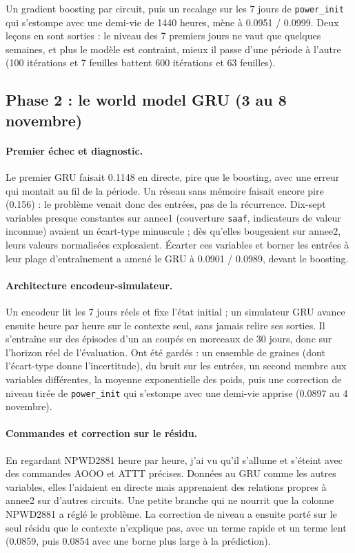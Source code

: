 \documentclass[11pt,a4paper]{article}
\newcommand{\code}[1]{\texttt{#1}}
\begin{document}
Un gradient boosting par circuit, puis un recalage sur les 7 jours de \code{power\_init} qui s'estompe avec une demi-vie de 1440 heures, mène à 0.0951 / 0.0999. Deux leçons en sont sorties : le niveau des 7 premiers jours ne vaut que quelques semaines, et plus le modèle est contraint, mieux il passe d'une période à l'autre (100 itérations et 7 feuilles battent 600 itérations et 63 feuilles).

\subsection{Phase 2 : le world model GRU (3 au 8 novembre)}

\paragraph{Premier échec et diagnostic.} Le premier GRU faisait 0.1148 en directe, pire que le boosting, avec une erreur qui montait au fil de la période. Un réseau sans mémoire faisait encore pire (0.156) : le problème venait donc des entrées, pas de la récurrence. Dix-sept variables presque constantes sur annee1 (couverture \code{saaf}, indicateurs de valeur inconnue) avaient un écart-type minuscule ; dès qu'elles bougeaient sur annee2, leurs valeurs normalisées explosaient. Écarter ces variables et borner les entrées à leur plage d'entraînement a amené le GRU à 0.0901 / 0.0989, devant le boosting.

\paragraph{Architecture encodeur-simulateur.} Un encodeur lit les 7 jours réels et fixe l'état initial ; un simulateur GRU avance ensuite heure par heure sur le contexte seul, sans jamais relire ses sorties. Il s'entraîne sur des épisodes d'un an coupés en morceaux de 30 jours, donc sur l'horizon réel de l'évaluation. Ont été gardés : un ensemble de graines (dont l'écart-type donne l'incertitude), du bruit sur les entrées, un second membre aux variables différentes, la moyenne exponentielle des poids, puis une correction de niveau tirée de \code{power\_init} qui s'estompe avec une demi-vie apprise (0.0897 au 4 novembre).

\paragraph{Commandes et correction sur le résidu.} En regardant NPWD2881 heure par heure, j'ai vu qu'il s'allume et s'éteint avec des commandes AOOO et ATTT précises. Données au GRU comme les autres variables, elles l'aidaient en directe mais apprenaient des relations propres à annee2 sur d'autres circuits. Une petite branche qui ne nourrit que la colonne NPWD2881 a réglé le problème. La correction de niveau a ensuite porté sur le seul résidu que le contexte n'explique pas, avec un terme rapide et un terme lent (0.0859, puis 0.0854 avec une borne plus large à la prédiction).
\end{document}
